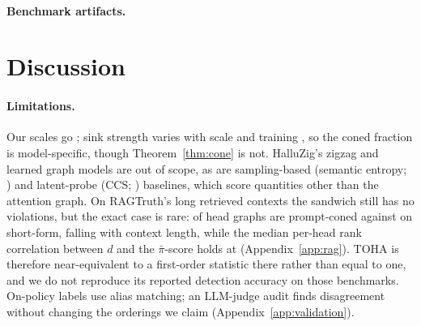 \documentclass{article}
\theoremstyle{definition}
\newcommand{\defect}{\delta}
\begin{document}
\begin{table}[!t]
\centering
\small
\caption{\textbf{TOHA against its first-order counterparts} (Proposition~\ref{prop:toha}). $\defect_P{=}0$: share of exactly prompt-coned head graphs, where $d$ equals the $\bar\pi$-score; $\rho$: median per-head rank correlation. AUCs: TOHA's head selection on each of the three scores, supervised probes on all heads of each, and the non-topological bank. Marks as in Table~\ref{tab:tests}; $\oplus$: late fusion; diagnostics in Table~\ref{tab:tohadiag}.}
\label{tab:toha}
\setlength{\tabcolsep}{2.5pt}\resizebox{\linewidth}{!}{\SinkTableToha}
\end{table}

\RESULTSTOHA

\paragraph{Benchmark artifacts.} \RESULTSARTIFACTS

\section{Discussion}
\label{sec:discussion}

\RESULTSDISCUSSION

\paragraph{Limitations.} Our scales go \ModelSizeRange{}; sink strength varies with scale and training \citep{gu2025attentionsink}, so the coned fraction is model-specific, though Theorem~\ref{thm:cone} is not. HalluZig's zigzag and learned graph models \citep{samaga2026halluzig,charm} are out of scope, as are sampling-based (semantic entropy; \citealp{farquhar2024semantic}) and latent-probe (CCS; \citealp{burns2022discovering}) baselines, which score quantities other than the attention graph. On RAGTruth's long retrieved contexts the sandwich still has no violations, but the exact case is rare: \RagConed{} of head graphs are prompt-coned against \TohaConedRange{} on short-form, falling with context length, while the median per-head rank correlation between $d$ and the $\bar\pi$-score holds at \RagRhoMaxp{} (Appendix~\ref{app:rag}). TOHA is therefore near-equivalent to a first-order statistic there rather than equal to one, and we do not reproduce its reported detection accuracy on those benchmarks. On-policy labels use alias matching; an LLM-judge audit finds \AuditDisagreeRange{} disagreement without changing the orderings we claim (Appendix~\ref{app:validation}).
\end{document}
